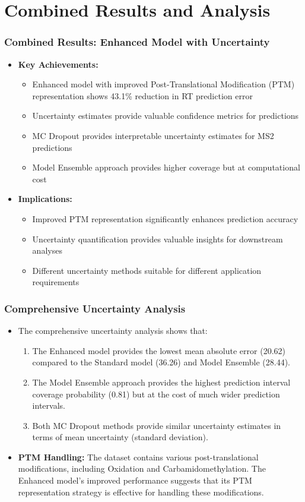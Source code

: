 \documentclass{beamer}
\begin{document}
\section{Combined Results and Analysis}
\begin{frame}
  \frametitle{Combined Results: Enhanced Model with Uncertainty}
  \begin{itemize}
    \item \textbf{Key Achievements:}
    \begin{itemize}
      \item Enhanced model with improved Post-Translational Modification (PTM) representation shows 43.1\% reduction in RT prediction error
      \item Uncertainty estimates provide valuable confidence metrics for predictions
      \item MC Dropout provides interpretable uncertainty estimates for MS2 predictions
      \item Model Ensemble approach provides higher coverage but at computational cost
    \end{itemize}
    \item \textbf{Implications:}
    \begin{itemize}
      \item Improved PTM representation significantly enhances prediction accuracy
      \item Uncertainty quantification provides valuable insights for downstream analyses
      \item Different uncertainty methods suitable for different application requirements
    \end{itemize}
  \end{itemize}
\end{frame}

\begin{frame}
  \frametitle{Comprehensive Uncertainty Analysis}
  \begin{itemize}
    \item The comprehensive uncertainty analysis shows that:
    \begin{enumerate}
      \item The Enhanced model provides the lowest mean absolute error (20.62) compared to the Standard model (36.26) and Model Ensemble (28.44).
      \item The Model Ensemble approach provides the highest prediction interval coverage probability (0.81) but at the cost of much wider prediction intervals.
      \item Both MC Dropout methods provide similar uncertainty estimates in terms of mean uncertainty (standard deviation).
    \end{enumerate}
    \item \textbf{PTM Handling:} The dataset contains various post-translational modifications, including Oxidation and Carbamidomethylation. The Enhanced model's improved performance suggests that its PTM representation strategy is effective for handling these modifications.
  \end{itemize}
\end{frame}
\end{document}

